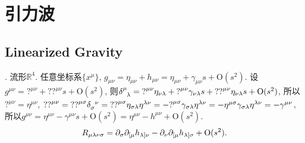 \chapter{引力波}\label{GW}

\section{Linearized Gravity}\label{Linearized_Gravity}

\cite{Wald1984}. 流形$\mathbb{R}^{4}$. 任意坐标系$\{x^{\mu}\}$, $g_{\mu\nu}=\eta_{\mu\nu}+h_{\mu\nu}=\eta_{\mu\nu}+\gamma_{\mu\nu}s+\text{O}(s^2)$. 设$g^{\mu\nu}={?}^{\mu\nu}+{??}^{\mu\nu}s+\text{O}(s^2)$, 则$\delta^{\mu}_{\ph{\mu}\lambda}={?}^{\mu\nu}\eta_{\nu\lambda}+{?}^{\mu\nu}\gamma_{\nu\lambda}s+{??}^{\mu\nu}\eta_{\nu\lambda}s+\text{O}(s^2)$, 所以${?}^{\mu\nu}=\eta^{\mu\nu}$, ${??}^{\mu\nu}={??}^{\mu\sigma}\delta_{\sigma}^{\ph{\sigma}\nu}={??}^{\mu\sigma}\eta_{\sigma\lambda}\eta^{\lambda\nu}=-{?}^{\mu\sigma}\gamma_{\sigma\lambda}\eta^{\lambda\nu}=-\eta^{\mu\sigma}\gamma_{\sigma\lambda}\eta^{\lambda\nu}=-\gamma^{\mu\nu}$, 所以$g^{\mu\nu}=\eta^{\mu\nu}-\gamma^{\mu\nu}s+\text{O}(s^2)=\eta^{\mu\nu}-h^{\mu\nu}+\text{O}(s^2)$.
\begin{equation}
    R_{\mu\lambda\nu\sigma}=\partial_\sigma\partial_{[\mu}h_{\lambda]\nu}-\partial_\nu\partial_{[\mu}h_{\lambda]\sigma}+\text{O}(s^2).
\end{equation}

